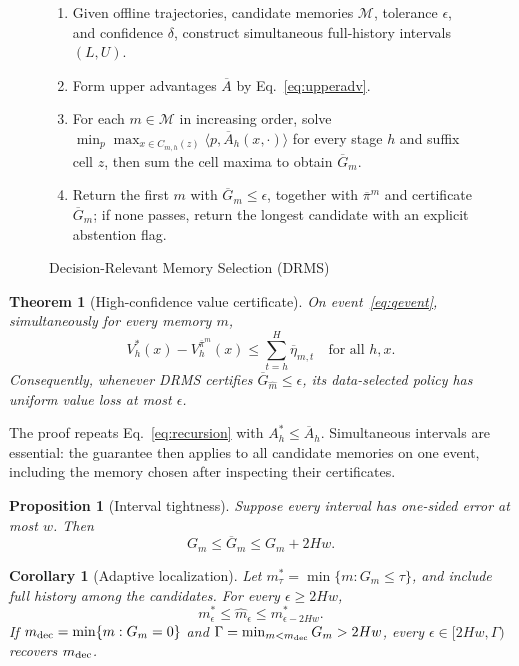 \documentclass[letterpaper]{article} %
\newtheorem{theorem}{Theorem}
\newtheorem{proposition}{Proposition}
\newtheorem{corollary}{Corollary}
\theoremstyle{remark}
\newcommand{\DRMS}{\textnormal{\textsc{DRMS}}}
\begin{document}
\begin{figure}[t]
\caption{Decision-Relevant Memory Selection (\DRMS)}
\label{alg:drms}
\begin{enumerate}
  \item Given offline trajectories, candidate memories $\mathcal M$,
  tolerance $\epsilon$, and confidence $\delta$, construct simultaneous
  full-history intervals $(L,U)$.
  \item Form upper advantages $\overline A$ by Eq.~\eqref{eq:upperadv}.
  \item For each $m\in\mathcal M$ in increasing order, solve
  $\min_p\max_{x\in C_{m,h}(z)}
  \langle p,\overline A_h(x,\cdot)\rangle$ for every stage $h$ and suffix
  cell $z$, then sum the cell maxima to obtain $\overline G_m$.
  \item Return the first $m$ with $\overline G_m\leq\epsilon$, together with
  $\overline\pi^m$ and certificate $\overline G_m$; if none passes, return
  the longest candidate with an explicit abstention flag.
\end{enumerate}
\end{figure}

\begin{theorem}[High-confidence value certificate]\label{thm:certificate}
On event~\eqref{eq:qevent}, simultaneously for every memory $m$,
\[
V_h^*(x)-V_h^{\overline\pi^m}(x)
\leq\sum_{t=h}^H\overline\eta_{m,t}
\quad\text{for all }h,x.
\tag{9}\label{eq:uniformcert}
\]
Consequently, whenever \DRMS{} certifies
$\overline G_{\widehat m}\leq\epsilon$, its data-selected policy has uniform
value loss at most $\epsilon$.
\end{theorem}

The proof repeats Eq.~\eqref{eq:recursion} with
$A_h^*\leq\overline A_h$. Simultaneous intervals are essential: the guarantee
then applies to all candidate memories on one event, including the memory
chosen after inspecting their certificates.

\begin{proposition}[Interval tightness]\label{prop:tightness}
Suppose every interval has one-sided error at most $w$. Then
\[
G_m\leq\overline G_m\leq G_m+2Hw.
\tag{10}\label{eq:inflation}
\]
\end{proposition}

\begin{corollary}[Adaptive localization]\label{cor:localization}
Let $m_\tau^*=\min\{m:G_m\leq\tau\}$, and include full history among the
candidates. For every $\epsilon\geq2Hw$,
\[
m_\epsilon^*\leq\widehat m_\epsilon
\leq m_{\epsilon-2Hw}^*.
\tag{11}\label{eq:localization}
\]
If $m_{\rm dec}=\min\{m:G_m=0\}$ and
$\Gamma=\min_{m<m_{\rm dec}}G_m>2Hw$, every
$\epsilon\in[2Hw,\Gamma)$ recovers $m_{\rm dec}$.
\end{corollary}
\end{document}
